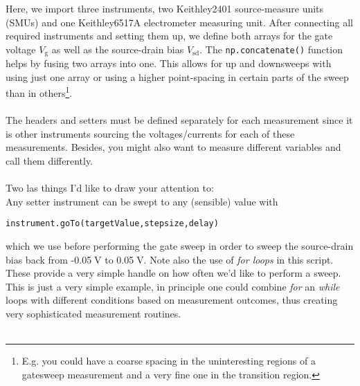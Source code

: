 \normalsize
Here, we import three instruments, two Keithley2401 source-measure units (SMUs) and one Keithley6517A electrometer measuring unit. After connecting all required instruments and setting them up, we define both arrays for the gate voltage $V_{\mathrm{g}}$ as well as the source-drain bias $V_{\mathrm{sd}}$. The \texttt{np.concatenate()} function helps by fusing two arrays into one. This allows for up and downsweeps with using just one array or using a higher point-spacing in certain parts of the sweep than in others\footnote{E.g. you could have a coarse spacing in the uninteresting regions of a gatesweep measurement and a very fine one in the transition region.}.\\
\\
The headers and setters must be defined separately for each measurement since it is other instruments sourcing the voltages/currents for each of these measurements. Besides, you might also want to measure different variables and call them differently.\\
\\
Two las things I'd like to draw your attention to:\\
Any setter instrument can be swept to any (sensible) value with
\begin{verbatim}
instrument.goTo(targetValue,stepsize,delay)
\end{verbatim} 
which we use before performing the gate sweep in order to sweep the source-drain bias back from -0.05$\;$V to 0.05$\;$V. Note also the use of \textit{for loops} in this script. These provide a very simple handle on how often we'd like to perform a sweep. This is just a very simple example, in principle one could combine \textit{for} an \textit{while} loops with different conditions based on measurement outcomes, thus creating very sophisticated measurement routines.\\
\\



